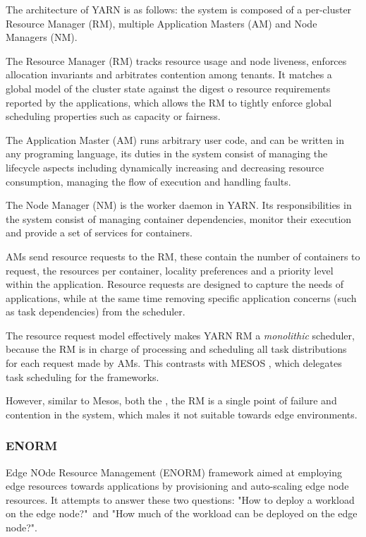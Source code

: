 The architecture of YARN is as follows: the system is composed of a per-cluster Resource Manager (RM), multiple Application Masters (AM) and Node Managers (NM). 

The Resource Manager (RM) tracks resource usage and node liveness, enforces allocation invariants and arbitrates contention among tenants. It matches a global model of the cluster state against the digest o resource requirements reported by the applications, which allows the RM to tightly enforce global scheduling properties such as capacity or fairness.

The Application Master (AM) runs arbitrary user code, and can be written in any programing language, its duties in the system consist of managing the lifecycle aspects including dynamically increasing and decreasing resource consumption, managing the flow of execution and handling faults. 

The Node Manager (NM) is the worker daemon in YARN. Its responsibilities in the system consist of managing container dependencies, monitor their execution and provide a set of services for containers. 

AMs send resource requests to the RM, these contain the number of containers to request, the resources per container, locality preferences and a priority level within the application. Resource requests are designed to capture the needs of applications, while at the same time removing specific application concerns (such as task dependencies) from the scheduler.

The resource request model effectively makes YARN RM a \textit{monolithic} scheduler, because the RM is in charge of processing and scheduling all task distributions for each request made by AMs. This contrasts with MESOS \cite{hindman2011mesos}, which delegates task scheduling for the frameworks. 

However, similar to Mesos, both the , the RM is a single point of failure and contention in the system, which males it not suitable towards edge environments.


\subsubsection{ENORM}

Edge NOde Resource Management \cite{wang2017enorm} (ENORM) framework aimed at employing edge resources towards applications by provisioning and auto-scaling edge node resources. It attempts to answer these two questions: "How to deploy a workload on the edge node?"\ and "How much of the workload can be deployed on the edge node?".

